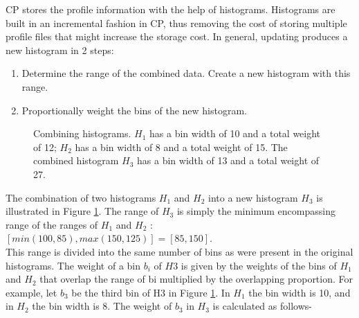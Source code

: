\documentclass[10pt]{report}          %
\begin{document}
CP stores the profile information with the help of histograms. Histograms are built in an incremental fashion in CP, thus removing the cost of storing multiple profile files that might increase the storage cost.  In general, updating produces a new histogram in 2 steps:

\begin{enumerate}
\item Determine the range of the combined data. Create a new histogram with this range.
\item Proportionally weight the bins of the new histogram.
\end{enumerate}

\begin{figure}[h]
\begin{center}
\caption{Combining histograms. $H_1$ has a bin width of 10
and a total weight of 12; $H_2$ has a bin width of 8 and a total
weight of 15. The combined histogram $H_3$ has a bin width
of 13 and a total weight of 27.
}
\end{center}
\label{fig:hist}
\end{figure}

The combination of two histograms $H_1$ and $H_2$ into a new histogram $H_3$ is illustrated in Figure \ref{fig:hist}. The range of $H_3$ is simply the minimum encompassing range of the ranges of $H_1$ and $H_2$ : $[min(100, 85), max(150, 125)] = [85, 150]$.
\\
This range is divided into the same number of bins as were present in the original histograms. The weight of a bin $b_i$ of $H3$ is given by the weights of the bins of $H_1$ and $H_2$ that overlap the range of bi multiplied by the overlapping proportion. For example, let $b_3$ be the third bin of H3 in
Figure \ref{fig:hist}. In $H_1$ the bin width is 10, and in $H_2$ the bin width
is 8. The weight of $b_3$ in $H_3$ is calculated as follows-
\end{document}

